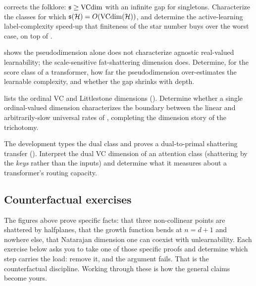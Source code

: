 \begin{openprob}
\label{op:star-vc-gap}
 corrects the folklore: $\mathfrak{s} \geq \mathrm{VCdim}$ with an infinite gap for singletons.  Characterize the classes for which $\mathfrak{s}(\mathcal{H}) = O(\mathrm{VCdim}(\mathcal{H}))$, and determine the active-learning label-complexity speed-up that finiteness of the star number buys over the worst case, on top of .
\end{openprob}

\begin{openprob}
\label{op:pdim-fat}
 shows the pseudodimension alone does not characterize agnostic real-valued learnability; the scale-sensitive fat-shattering dimension does.  Determine, for the score class of a transformer, how far the pseudodimension over-estimates the learnable complexity, and whether the gap shrinks with depth.
\end{openprob}

\begin{openprob}
\label{op:ordinal-dim-slow}
 lists the ordinal VC and Littlestone dimensions ().  Determine whether a single ordinal-valued dimension characterizes the boundary between the linear and arbitrarily-slow universal rates of , completing the dimension story of the trichotomy.
\end{openprob}

\begin{openprob}
\label{op:dual-vc-attention}
The development types the dual class and proves a dual-to-primal shattering transfer ().  Interpret the dual VC dimension of an attention class (shattering by the \emph{keys} rather than the inputs) and determine what it measures about a transformer's routing capacity.
\end{openprob}

\subsection*{Counterfactual exercises}

The figures above prove specific facts: that three non-collinear points are shattered by halfplanes,
that the growth function bends at $n = d+1$ and nowhere else, that Natarajan dimension one can
coexist with unlearnability.  Each exercise below asks you to take one of those specific proofs and
determine which step carries the load: remove it, and the argument fails.  That is the counterfactual
discipline.  Working through these is how the general claims become yours.

